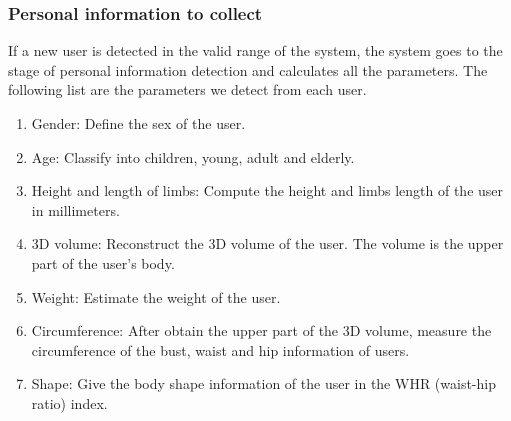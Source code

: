 \subsubsection{Personal information to collect}
If a new user is detected in the valid range of the system, the system goes to the stage of personal information detection and calculates all the parameters. The following list are the parameters we detect from each user.%
\begin{enumerate} [label=\arabic*.]
	\item  Gender: Define the sex of the user.
	\item Age: Classify into children, young, adult and elderly.
	\item  Height and length of limbs: Compute the height and limbs length of the user in millimeters.
	\item 3D volume: Reconstruct the 3D volume of the user. The volume is the upper part of the user's body.
	\item  Weight: Estimate the weight of the user.
	\item  Circumference: After obtain the upper part of the 3D volume, measure the circumference of the bust, waist and hip information of users.
	\item  Shape: Give the body shape information of the user in the WHR (waist-hip ratio) index.
\end{enumerate}

